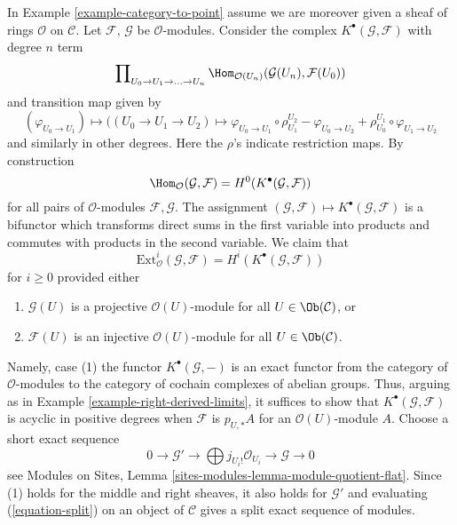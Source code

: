 \begin{example}
\label{example-computing-exts}
In Example \ref{example-category-to-point} assume we are moreover given
a sheaf of rings $\mathcal{O}$ on $\mathcal{C}$. Let
$\mathcal{F}$, $\mathcal{G}$ be $\mathcal{O}$-modules.
Consider the complex $K^\bullet(\mathcal{G}, \mathcal{F})$
with degree $n$ term
$$
\prod\nolimits_{U_0 \to U_1 \to \ldots \to U_n}
\Hom_{\mathcal{O}(U_n)}(\mathcal{G}(U_n), \mathcal{F}(U_0))
$$
and transition map given by
$$
(\varphi_{U_0 \to U_1})
\longmapsto
((U_0 \to U_1 \to U_2) \mapsto
\varphi_{U_0 \to U_1} \circ \rho^{U_2}_{U_1}
- \varphi_{U_0 \to U_2}
+ \rho^{U_1}_{U_0} \circ \varphi_{U_1 \to U_2}
$$
and similarly in other degrees. Here the $\rho$'s indicate restriction maps.
By construction
$$
\Hom_\mathcal{O}(\mathcal{G}, \mathcal{F}) =
H^0(K^\bullet(\mathcal{G}, \mathcal{F}))
$$
for all pairs of $\mathcal{O}$-modules $\mathcal{F}, \mathcal{G}$.
The assignment
$(\mathcal{G}, \mathcal{F}) \mapsto K^\bullet(\mathcal{G}, \mathcal{F})$
is a bifunctor which transforms direct sums in the first variable into
products and commutes with products in the second variable.
We claim that
$$
\text{Ext}^i_\mathcal{O}(\mathcal{G}, \mathcal{F}) =
H^i(K^\bullet(\mathcal{G}, \mathcal{F}))
$$
for $i \geq 0$ provided either
\begin{enumerate}
\item $\mathcal{G}(U)$ is a projective $\mathcal{O}(U)$-module
for all $U \in \Ob(\mathcal{C})$, or
\item $\mathcal{F}(U)$ is an injective $\mathcal{O}(U)$-module
for all $U \in \Ob(\mathcal{C})$.
\end{enumerate}
Namely, case (1) the functor $K^\bullet(\mathcal{G}, -)$
is an exact functor from the category of $\mathcal{O}$-modules
to the category of cochain complexes of abelian groups.
Thus, arguing as in Example \ref{example-right-derived-limits},
it suffices to show that $K^\bullet(\mathcal{G}, \mathcal{F})$
is acyclic in positive degrees when $\mathcal{F}$ is $p_{U, *}A$
for an $\mathcal{O}(U)$-module $A$.
Choose a short exact sequence
\begin{equation}
\label{equation-split}
0 \to \mathcal{G}' \to \bigoplus j_{U_i!}\mathcal{O}_{U_i} \to
\mathcal{G} \to 0
\end{equation}
see Modules on Sites, Lemma \ref{sites-modules-lemma-module-quotient-flat}.
Since (1) holds for the middle and right sheaves, it also holds for
$\mathcal{G}'$ and evaluating (\ref{equation-split})
on an object of $\mathcal{C}$
gives a split exact sequence of modules.

\end{example}
